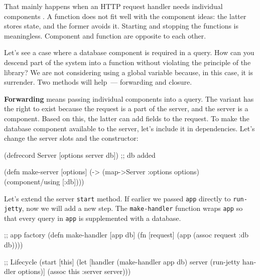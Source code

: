That mainly happens when an HTTP request handler needs individual components . A function does not fit well with the component ideas: the latter stores state, and the former avoids it. Starting and stopping the functions is meaningless. Component and function are opposite to each other.

Let's see a case where a database component is required in a query. How can you descend part of the system into a function without violating the principle of the library? We are not considering using a global variable because, in this case, it is surrender. Two methods will help~--- forwarding and closure.


\textbf{Forwarding} means passing individual components into a query. The variant has the right to exist because the request is a part of the server, and the server is a component. Based on this, the latter can add fields to the request. To make the database component available to the server, let's include it in dependencies. Let's change the server slots and the constructor:

\begin{english}
  \begin{clojure}
(defrecord Server
  [options server db]) ;; db added

(defn make-server
  [options]
  (-> (map->Server {:options options})
      (component/using [:db])))
  \end{clojure}
\end{english}

Let's extend the server \verb|start| method. If earlier we passed \verb|app| directly to \verb|run-jetty|, now we will add a new step. The \texttt{make\--hand\-ler} function wraps \verb|app| so that every query in \verb|app| is supplemented with a database.

\ifnarrow

\begin{english}
  \begin{clojure}
;; app factory
(defn make-handler [app db]
  (fn [request]
    (app (assoc request :db db))))

;; Lifecycle
(start [this]
  (let [handler (make-handler app db)
        server (run-jetty handler
                 options)]
    (assoc this :server server)))
  \end{clojure}
\end{english}

\else

